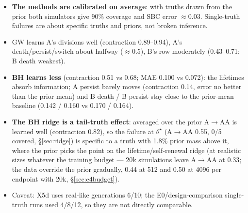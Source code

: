\documentclass[10pt,a4paper]{article}
\newcommand{\blk}[1]{\par\needspace{5\baselineskip}\smallskip{\sffamily\bfseries\color{inkgray}#1}\par}
\newcommand{\Comment}{\blk{Comment}}
\begin{document}
\Comment
\begin{itemize}
\item \textbf{The methods are calibrated on average}: with truths drawn from the prior both simulators give 90\% coverage and SBC error $\approx 0.03$. Single-truth failures are about specific truths and priors, not broken inference.
\item GW learns A's divisions well (contraction 0.89--0.94), A's death/persist/switch about halfway ($\approx 0.5$), B's row moderately (0.43--0.71; B death weakest).
\item \textbf{BH learns less} (contraction 0.51 vs 0.68; MAE 0.100 vs 0.072): the lifetimes absorb information; A persist barely moves (contraction 0.14, error no better than the prior mean) and B death / B persist stay close to the prior-mean baseline (0.142 / 0.160 vs 0.170 / 0.164).
\item \textbf{The BH ridge is a tail-truth effect}: averaged over the prior A$\to$AA is learned well (contraction 0.82), so the failure at $\theta^\star$ (A$\to$AA 0.55, 0/5 covered, \S\ref{sec:ridge}) is specific to a truth with 1.8\% prior mass above it, where the prior picks the point on the lifetime/self-renewal ridge (at realistic sizes whatever the training budget --- 20k simulations leave A$\to$AA at 0.33; the data override the prior gradually, 0.44 at 512 and 0.50 at 4096 per endpoint with 20k, \S\ref{sec:e4budget}).
\item Caveat: X5d uses real-like generations 6/10; the E0/design-comparison single-truth runs used 4/8/12, so they are not directly comparable.
\end{itemize}

\end{document}
